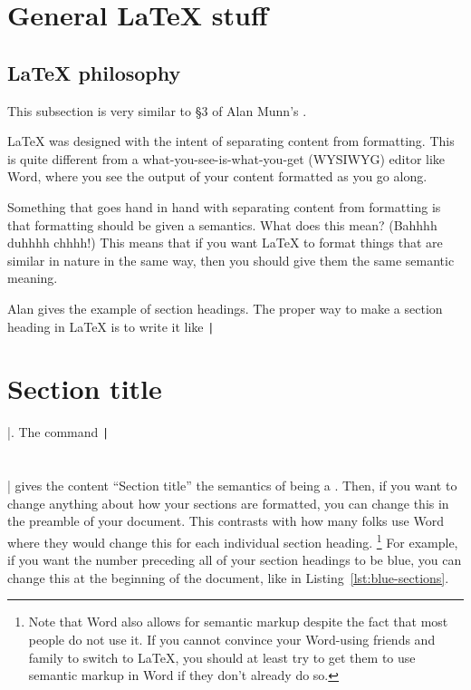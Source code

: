 
\section{General \LaTeX{} stuff}
\label{sec:general-latex-stuff}

\subsection{\LaTeX{} philosophy}
\label{subsec:latex-philosophy}

This subsection is very similar to \S3 of Alan Munn's .

\LaTeX{} was designed with the intent of separating content from formatting.
This is quite different from a what-you-see-is-what-you-get (WYSIWYG) editor like Word, where you see the output of your content formatted as you go along.

Something that goes hand in hand with separating content from formatting is that formatting should be given a semantics.
What does this mean?
(Bahhhh duhhhh chhhh!)
This means that if you want \LaTeX{} to format things that are similar in nature in the same way, then you should give them the same semantic meaning.

Alan gives the example of section headings.
The proper way to make a section heading in \LaTeX{} is to write it like \texttt|\section{Section title}|.
The command \texttt|\section{}| gives the content ``Section title'' the semantics of being a .
Then, if you want to change anything about how your sections are formatted, you can change this in the preamble of your document.
This contrasts with how many folks use Word where they would change this for each individual section heading.%
\footnote{%
Note that Word also allows for semantic markup despite the fact that most people do not use it.
If you cannot convince your Word-using friends and family to switch to \LaTeX, you should at least try to get them to use semantic markup in Word if they don't already do so.
\ASCIIEmoji{:)}%
}
For example, if you want the number preceding all of your section headings to be blue, you can change this at the beginning of the document, like in Listing~\ref{lst:blue-sections}.

